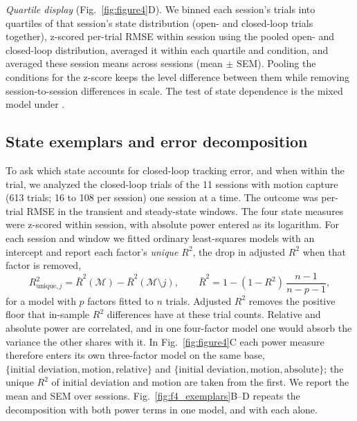 \emph{Quartile display} (Fig.~\ref{fig:figure4}D). We binned each session's
trials into quartiles of that session's state distribution (open- and
closed-loop trials together), z-scored per-trial RMSE within session using the
pooled open- and closed-loop distribution, averaged it within each quartile and
condition, and averaged these session means across sessions (mean $\pm$ SEM).
Pooling the conditions for the z-score keeps the level difference between them
while removing session-to-session differences in scale. The test of state
dependence is the mixed model under .

\subsection*{State exemplars and error decomposition}

To ask which state accounts for closed-loop tracking error, and when within the
trial, we analyzed the closed-loop trials of the 11 sessions with motion capture
(613 trials; 16 to 108 per session) one session at a time. The outcome was
per-trial RMSE in the transient and steady-state windows. The four state
measures were z-scored within session, with absolute power entered as its
logarithm. For each session and window we fitted ordinary least-squares models
with an intercept and report each factor's \emph{unique} $R^2$, the drop in
adjusted $R^2$ when that factor is removed,
%
\begin{equation}
    R^{2}_{\mathrm{unique},j} = \bar{R}^{2}(\mathcal{M}) - \bar{R}^{2}(\mathcal{M} \setminus j),
    \qquad \bar{R}^{2} = 1 - (1 - R^{2})\,\frac{n - 1}{n - p - 1},
    \label{eq:uniqueR2}
\end{equation}
%
for a model with $p$ factors fitted to $n$ trials. Adjusted $R^2$ removes the
positive floor that in-sample $R^2$ differences have at these trial counts.
Relative and absolute power are correlated, and in one four-factor model one
would absorb the variance the other shares with it. In Fig.~\ref{fig:figure4}C
each power measure therefore enters its own three-factor model on the same base,
$\{\text{initial deviation}, \text{motion}, \text{relative}\}$ and
$\{\text{initial deviation}, \text{motion}, \text{absolute}\}$; the unique $R^2$
of initial deviation and motion are taken from the first. We report the mean and
SEM over sessions. Fig.~\ref{fig:f4_exemplars}B--D repeats the decomposition
with both power terms in one model, and with each alone.


